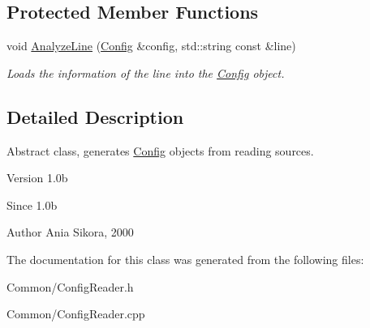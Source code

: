 \subsection*{Protected Member Functions}
\begin{DoxyCompactItemize}
\item 
\hypertarget{class_common_1_1_config_reader_aa7827a9e8b91a9052e02f4be96d0ef7a}{void \hyperlink{class_common_1_1_config_reader_aa7827a9e8b91a9052e02f4be96d0ef7a}{Analyze\-Line} (\hyperlink{class_common_1_1_config}{Config} \&config, std\-::string const \&line)}\label{class_common_1_1_config_reader_aa7827a9e8b91a9052e02f4be96d0ef7a}

\begin{DoxyCompactList}\small\item\em Loads the information of the line into the \hyperlink{class_common_1_1_config}{Config} object. \end{DoxyCompactList}\end{DoxyCompactItemize}


\subsection{Detailed Description}
Abstract class, generates \hyperlink{class_common_1_1_config}{Config} objects from reading sources. 

\begin{DoxyVersion}{Version}
1.\-0b 
\end{DoxyVersion}
\begin{DoxySince}{Since}
1.\-0b 
\end{DoxySince}
\begin{DoxyAuthor}{Author}
Ania Sikora, 2000 
\end{DoxyAuthor}


The documentation for this class was generated from the following files\-:\begin{DoxyCompactItemize}
\item 
Common/Config\-Reader.\-h\item 
Common/Config\-Reader.\-cpp\end{DoxyCompactItemize}
